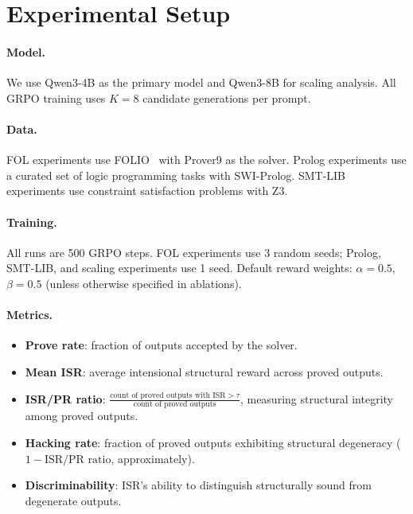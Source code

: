 \documentclass[11pt,a4paper]{article}
\begin{document}
\section{Experimental Setup}

\paragraph{Model.}
We use Qwen3-4B as the primary model and Qwen3-8B for scaling analysis.
All GRPO training uses $K=8$ candidate generations per prompt.

\paragraph{Data.}
FOL experiments use FOLIO~\cite{han2022folio} with Prover9 as the solver.
Prolog experiments use a curated set of logic programming tasks with SWI-Prolog.
SMT-LIB experiments use constraint satisfaction problems with Z3.

\paragraph{Training.}
All runs are 500 GRPO steps.
FOL experiments use 3 random seeds; Prolog, SMT-LIB, and scaling experiments use 1 seed.
Default reward weights: $\alpha = 0.5$, $\beta = 0.5$ (unless otherwise specified in ablations).

\paragraph{Metrics.}
\begin{itemize}[nosep]
  \item \textbf{Prove rate}: fraction of outputs accepted by the solver.
  \item \textbf{Mean ISR}: average intensional structural reward across proved outputs.
  \item \textbf{ISR/PR ratio}: $\frac{\text{count of proved outputs with ISR} > \tau}{\text{count of proved outputs}}$, measuring structural integrity among proved outputs.
  \item \textbf{Hacking rate}: fraction of proved outputs exhibiting structural degeneracy ($1 - \text{ISR/PR ratio}$, approximately).
  \item \textbf{Discriminability}: ISR's ability to distinguish structurally sound from degenerate outputs.
\end{itemize}
\end{document}
